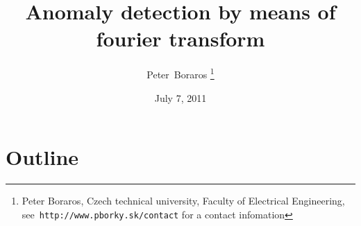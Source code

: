 \documentclass[a4paper]{IEEEtran}
\begin{document}
\title{Anomaly detection by means of fourier transform}
\date{July 7, 2011}
\author{Peter~Boraros %
\thanks{{Peter Boraros}, Czech technical university, Faculty of Electrical Engineering,
see~\texttt{http://www.pborky.sk/contact} for a contact infomation}}%



\maketitle
\IEEEdisplaynotcompsoctitleabstractindextext
\IEEEpeerreviewmaketitle

\section{Outline}


\end{document}
